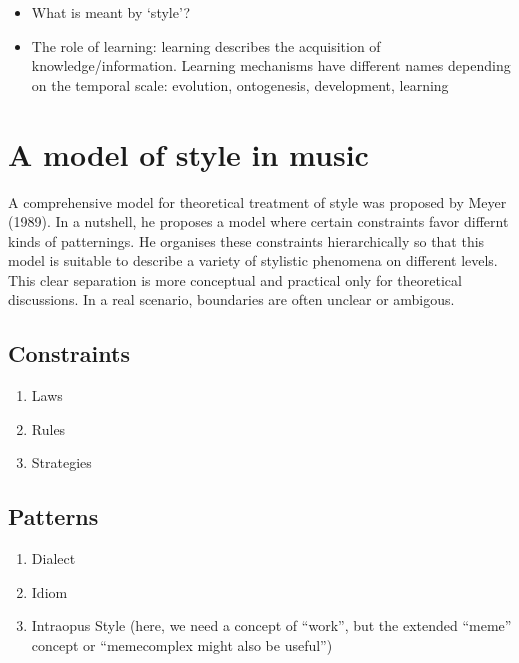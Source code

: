 \documentclass[
  a4paperpaper,
  ,captions=tableheading
]{scrbook}
\providecommand{\tightlist}{%
  \setlength{\itemsep}{0pt}\setlength{\parskip}{0pt}}
\begin{document}
\begin{itemize}
\tightlist
\item
  What is meant by `style'?
\item
  The role of learning: learning describes the acquisition of
  knowledge/information. Learning mechanisms have different names
  depending on the temporal scale: evolution, ontogenesis, development,
  learning
\end{itemize}

\hypertarget{a-model-of-style-in-music}{%
\section{A model of style in music}\label{a-model-of-style-in-music}}

A comprehensive model for theoretical treatment of style was proposed by
Meyer (1989). In a nutshell, he proposes a model where certain
constraints favor differnt kinds of patternings. He organises these
constraints hierarchically so that this model is suitable to describe a
variety of stylistic phenomena on different levels. This clear
separation is more conceptual and practical only for theoretical
discussions. In a real scenario, boundaries are often unclear or
ambigous.

\hypertarget{constraints}{%
\subsection{Constraints}\label{constraints}}

\begin{enumerate}
\def\labelenumi{\arabic{enumi}.}
\tightlist
\item
  Laws
\item
  Rules
\item
  Strategies
\end{enumerate}

\hypertarget{patterns}{%
\subsection{Patterns}\label{patterns}}

\begin{enumerate}
\def\labelenumi{\arabic{enumi}.}
\tightlist
\item
  Dialect
\item
  Idiom
\item
  Intraopus Style (here, we need a concept of ``work'', but the extended
  ``meme'' concept or ``memecomplex might also be useful'')
\end{enumerate}
\end{document}
